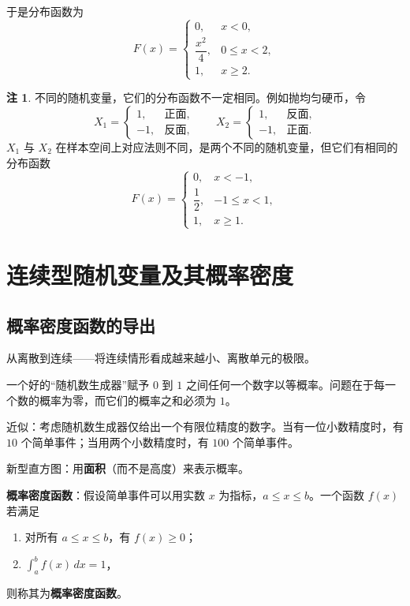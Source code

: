 \documentclass[11pt,a4paper]{report}
\theoremstyle{definition}
\newtheorem{note}{注}[chapter]
\begin{document}
于是分布函数为
\[
F(x) = \begin{cases}
0, & x < 0, \\[0.3em]
\dfrac{x^2}{4}, & 0 \leq x < 2, \\[0.5em]
1, & x \geq 2.
\end{cases}
\]

\begin{note}
不同的随机变量，它们的分布函数不一定相同。例如抛均匀硬币，令
\[
X_1 = \begin{cases} 1, & \text{正面}, \\ -1, & \text{反面}, \end{cases} \qquad
X_2 = \begin{cases} 1, & \text{反面}, \\ -1, & \text{正面}. \end{cases}
\]
$X_1$ 与 $X_2$ 在样本空间上对应法则不同，是两个不同的随机变量，但它们有相同的分布函数
\[
F(x) = \begin{cases} 0, & x < -1, \\[0.3em] \dfrac{1}{2}, & -1 \leq x < 1, \\[0.5em] 1, & x \geq 1. \end{cases}
\]
\end{note}

\section{连续型随机变量及其概率密度}

\subsection{概率密度函数的导出}

从离散到连续——将连续情形看成越来越小、离散单元的极限。

一个好的``随机数生成器''赋予 $0$ 到 $1$ 之间任何一个数字以等概率。问题在于每一个数的概率为零，而它们的概率之和必须为 $1$。

近似：考虑随机数生成器仅给出一个有限位精度的数字。当有一位小数精度时，有 $10$ 个简单事件；当用两个小数精度时，有 $100$ 个简单事件。

新型直方图：用\textbf{面积}（而不是高度）来表示概率。

\textbf{概率密度函数}：假设简单事件可以用实数 $x$ 为指标，$a \leq x \leq b$。一个函数 $f(x)$ 若满足
\begin{enumerate}[label=(\arabic*),leftmargin=2em]
    \item 对所有 $a \leq x \leq b$，有 $f(x) \geq 0$；
    \item $\displaystyle\int_a^b f(x)\,dx = 1$，
\end{enumerate}
则称其为\textbf{概率密度函数}。
\end{document}
